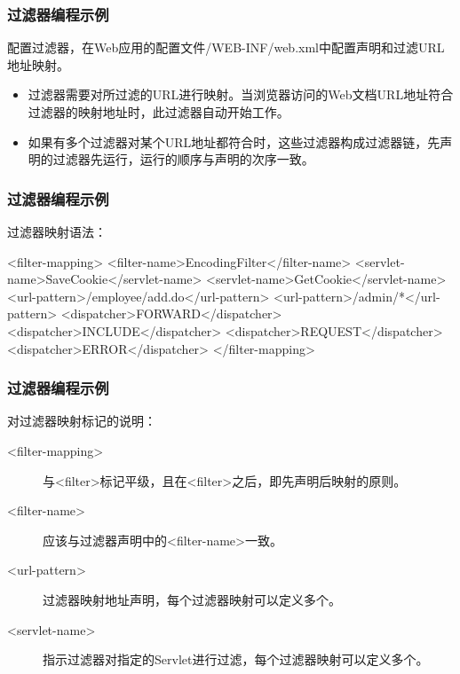 \begin{frame}[fragile] %
\frametitle{过滤器编程示例} 

配置过滤器，在Web应用的配置文件/WEB-INF/web.xml中配置声明和过滤URL地址映射。


\begin{itemize}
\item 过滤器需要对所过滤的URL进行映射。当浏览器访问的Web文档URL地址符合过滤器的映射地址时，此过滤器自动开始工作。
\item 如果有多个过滤器对某个URL地址都符合时，这些过滤器构成过滤器链，先声明的过滤器先运行，运行的顺序与声明的次序一致。
\end{itemize}
\end{frame}

\begin{frame}[fragile] %
\frametitle{过滤器编程示例} 

过滤器映射语法：

\begin{xmlCode}
<filter-mapping>
  <filter-name>EncodingFilter</filter-name>
  <servlet-name>SaveCookie</servlet-name>
  <servlet-name>GetCookie</servlet-name>
  <url-pattern>/employee/add.do</url-pattern>
  <url-pattern>/admin/*</url-pattern>
  <dispatcher>FORWARD</dispatcher>
  <dispatcher>INCLUDE</dispatcher>
  <dispatcher>REQUEST</dispatcher>
  <dispatcher>ERROR</dispatcher>
</filter-mapping>
\end{xmlCode}
\end{frame}

\begin{frame}[fragile] %
\frametitle{过滤器编程示例} 

对过滤器映射标记的说明：

\begin{description}
\item[<filter-mapping>] 与<filter>标记平级，且在<filter>之后，即先声明后映射的原则。
\item[<filter-name>] 应该与过滤器声明中的<filter-name>一致。
\item[<url-pattern>] 过滤器映射地址声明，每个过滤器映射可以定义多个。
\item[<servlet-name>] 指示过滤器对指定的Servlet进行过滤，每个过滤器映射可以定义多个。
\end{description}
\end{frame}


